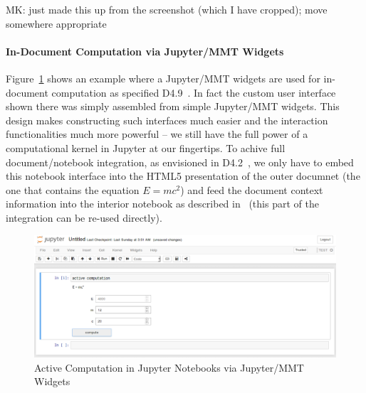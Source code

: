 \begin{newpart}{MK: just made this up from the screenshot (which I have cropped); move somewhere appropriate}
  \paragraph{In-Document Computation via Jupyter/MMT Widgets}
  Figure~\ref{fig:ac} shows an example where a Jupyter/MMT widgets are used for in-document computation as specified D4.9~\cite{ODK-D4.9}.
  In fact the custom user interface shown there was simply assembled from simple Jupyter/MMT widgets.
  This design makes constructing such interfaces much easier and the interaction functionalities much more powerful -- we still have the full power of a computational kernel in Jupyter at our fingertips. 
  To achive full document/notebook integration, as envisioned in D4.2~\cite{ODK-D4.2}, we only have to embed this notebook interface into the HTML5 presentation of the outer documnet (the one that contains the equation $E=mc^2$) and feed the document context information into the interior notebook as described in~\cite{ODK-D4.9} (this part of the integration can be re-used directly).

  \begin{figure}[ht]\centering
    \includegraphics[width=12cm]{activecomp}
    \caption{Active Computation in Jupyter Notebooks via Jupyter/MMT Widgets}\label{fig:ac}
  \end{figure}
\end{newpart}


